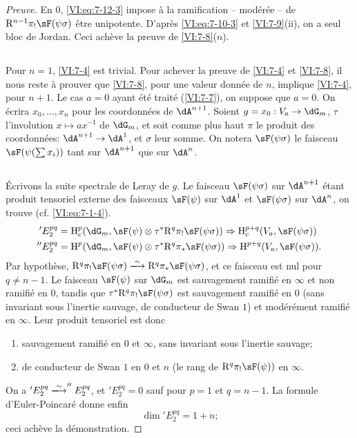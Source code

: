 \begin{proof}[Preuve]
En $0$, \eqref{VI:eq:7-12-3} impose à la ramification -- modérée -- de 
$\eR^{n-1} \pi_! \sF(\psi\sigma)$ être unipotente. D'après 
\eqref{VI:eq:7-10-3} et \ref{VI:7-9}(ii), on a seul bloc de Jordan. Ceci 
achève la preuve de \ref{VI:7-8}($n$). 





\subsection{}\label{VI:7-13}

Pour $n=1$, \ref{VI:7-4} est trivial. Pour achever la preuve de \ref{VI:7-4} et 
\ref{VI:7-8}, il nous reste à prouver que \ref{VI:7-8}, pour une valeur 
donnée de $n$, implique \ref{VI:7-4}, pour $n+1$. Le cas $a=0$ ayant été 
traité (\ref{VI:7-7}), on suppose que $a=0$. On écrira $x_0,\dots,x_n$ pour 
les coordonnées de $\dA^{n+1}$. Soient $g=x_0:V_a\to \dG_m$, $\tau$ 
l'involution $x\mapsto a x^{-1}$ de $\dG_m$, et soit comme plus haut $\pi$ le 
produit des coordonnées: $\dA^{n+1} \to \dA^1$, et $\sigma$ leur somme. On 
notera $\sF(\psi\sigma)$ le faisceau $\sF(\psi(\sum x_i))$ tant sur $\dA^{n+1}$ 
que sur $\dA^n$. 





\subsection{}\label{VI:7-14}

Écrivons la suite spectrale de Leray de $g$. Le faisceau $\sF(\psi\sigma)$ sur 
$\dA^{n+1}$ étant produit tensoriel externe des faisceaux $\sF(\psi)$ sur 
$\dA^1$ et $\sF(\psi\sigma)$ sur $\dA^n$, on trouve (cf. \eqref{VI:eq:7-1-4}). 
\begin{align*}
  'E_2^{p q} &= \h_c^p(\dG_m,\sF(\psi)\otimes \tau^\ast \eR^q \pi_! \sF(\psi\sigma)) \Rightarrow \h_c^{p+q}(V_a,\sF(\psi\sigma)) \\
  ''E_2^{p q} &= \h^p(\dG_m,\sF(\psi)\otimes \tau^\ast \eR^q \pi_\ast \sF(\psi\sigma)) \Rightarrow \h^{p+q}(V_a,\sF(\psi\sigma)) \text{.} 
\end{align*}
Par hypothèse, 
$\eR^q \pi_! \sF(\psi\sigma) \iso \eR^q \pi_\ast \sF(\psi\sigma)$, et ce 
faisceau est nul pour $q\ne n-1$. Le faisceau $\sF(\psi)$ sur $\dG_m$ est 
sauvagement ramifié en $\infty$ et non ramifié en $0$, tandis que 
$\tau^\ast \eR^q \pi_! \sF(\psi\sigma)$ est sauvagement ramifié en $0$ (sans 
invariant sous l'inertie sauvage, de conducteur de Swan $1$) et modérément 
ramifié en $\infty$. Leur produit tensoriel est donc 
\begin{enumerate}[\indent a)]
  \item sauvagement ramifié en $0$ et $\infty$, sans invariant sous l'inertie 
    sauvage; 
  \item de conducteur de Swan $1$ en $0$ et $n$ (le rang de 
    $\eR^q \pi_! \sF(\psi))$ en $\infty$. 
\end{enumerate}
On a $'E_2^{p q} \iso ''E_2^{p q}$, et $'E_2^{p q}=0$ sauf pour $p=1$ et 
$q=n-1$. La formule d'Euler-Poincaré donne enfin 
\[
  \dim{'E_2^{p q}} = 1+n \text{;} 
\]
ceci achève la démonstration. 
\end{proof}
